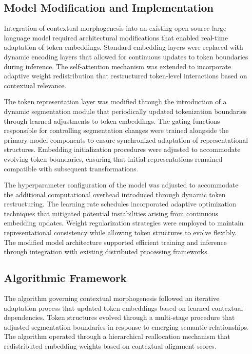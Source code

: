 \documentclass{article}
\begin{document}
\subsection{Model Modification and Implementation}

Integration of contextual morphogenesis into an existing open-source large language model required architectural modifications that enabled real-time adaptation of token embeddings. Standard embedding layers were replaced with dynamic encoding layers that allowed for continuous updates to token boundaries during inference. The self-attention mechanism was extended to incorporate adaptive weight redistribution that restructured token-level interactions based on contextual relevance. 

The token representation layer was modified through the introduction of a dynamic segmentation module that periodically updated tokenization boundaries through learned adjustments to token embeddings. The gating functions responsible for controlling segmentation changes were trained alongside the primary model components to ensure synchronized adaptation of representational structures. Embedding initialization procedures were adjusted to accommodate evolving token boundaries, ensuring that initial representations remained compatible with subsequent transformations. 

The hyperparameter configuration of the model was adjusted to accommodate the additional computational overhead introduced through dynamic token restructuring. The learning rate schedules incorporated adaptive optimization techniques that mitigated potential instabilities arising from continuous embedding updates. Weight regularization strategies were employed to maintain representational consistency while allowing token structures to evolve flexibly. The modified model architecture supported efficient training and inference through integration with existing distributed processing frameworks. 

\subsection{Algorithmic Framework}

The algorithm governing contextual morphogenesis followed an iterative adaptation process that updated token embeddings based on learned contextual dependencies. Token structures evolved through a multi-stage procedure that adjusted segmentation boundaries in response to emerging semantic relationships. The algorithm operated through a hierarchical reallocation mechanism that redistributed embedding weights based on contextual alignment scores. 
\end{document}
